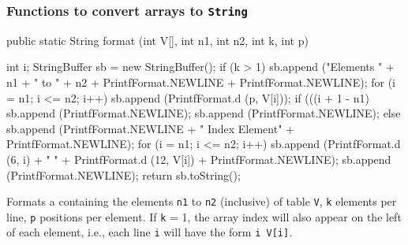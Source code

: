 \subsubsection*{Functions to convert arrays to \texttt{String}}
\begin{code}

   public static String format (int V[], int n1, int n2, int k, int p)\begin{hide} {
      int i;
      StringBuffer sb = new StringBuffer();
      if (k > 1) {
         sb.append ("Elements  " + n1 + "  to  " + n2 +
                     PrintfFormat.NEWLINE + PrintfFormat.NEWLINE);
         for (i = n1; i <= n2; i++) {
            sb.append (PrintfFormat.d (p, V[i]));
            if (((i + 1 - n1) %
               sb.append (PrintfFormat.NEWLINE);
         }
         sb.append (PrintfFormat.NEWLINE);
      }
      else {
         sb.append (PrintfFormat.NEWLINE + " Index        Element" +
                    PrintfFormat.NEWLINE);
         for (i = n1; i <= n2; i++)
            sb.append (PrintfFormat.d (6, i) + "   " +
                      PrintfFormat.d (12, V[i]) + PrintfFormat.NEWLINE);
      }
      sb.append (PrintfFormat.NEWLINE);
      return sb.toString();
   }\end{hide}
\end{code}
 \begin{tabb}  Formats a  containing the elements \texttt{n1}
  to \texttt{n2} (inclusive) of table \texttt{V},
  \texttt{k} elements per line, \texttt{p} positions per element.
  If  \texttt{k} = 1, the array index will also appear on the left
  of each element, i.e., each line \texttt{i} will have the form \texttt{i V[i]}.
 \end{tabb}
\begin{htmlonly}
\end{htmlonly}
